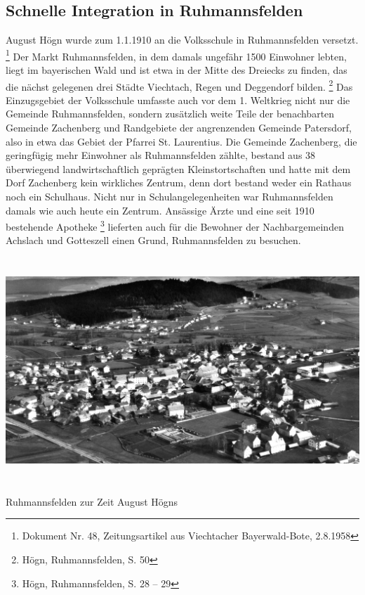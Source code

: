 \subsection{Schnelle Integration in Ruhmannsfelden}

August Högn wurde zum 1.1.1910 an
die Volksschule in Ruhmannsfelden versetzt. \footnote{Dokument Nr. 48,
Zeitungsartikel aus Viechtacher Bayerwald-Bote, 2.8.1958} Der Markt
Ruhmannsfelden, in dem damals ungefähr 1500 Einwohner lebten, liegt im
bayerischen Wald und ist etwa in der Mitte des Dreiecks zu finden, das
die nächst gelegenen drei Städte Viechtach, Regen und Deggendorf
bilden. \footnote{Högn, Ruhmannsfelden, S. 50} Das Einzugsgebiet der
Volksschule umfasste auch vor dem 1. Weltkrieg nicht nur die Gemeinde
Ruhmannsfelden, sondern zusätzlich weite Teile der benachbarten
Gemeinde Zachenberg und Randgebiete der angrenzenden Gemeinde
Patersdorf, also in etwa das Gebiet der Pfarrei St. Laurentius. Die
Gemeinde Zachenberg, die geringfügig mehr Einwohner als Ruhmannsfelden
zählte, bestand aus 38 überwiegend landwirtschaftlich geprägten
Kleinstortschaften und hatte mit dem Dorf Zachenberg kein wirkliches
Zentrum, denn dort bestand weder ein Rathaus noch ein Schulhaus. Nicht
nur in Schulangelegenheiten war Ruhmannsfelden damals wie auch heute
ein Zentrum. Ansässige Ärzte und eine seit 1910 bestehende
Apotheke \footnote{Högn, Ruhmannsfelden, S. 28 – 29} lieferten auch für
die Bewohner der Nachbargemeinden Achslach und Gotteszell einen Grund,
Ruhmannsfelden zu besuchen.


\includegraphics[width=15.981cm,height=8.446cm]{pictures/zulassungsarbeit-img016.jpg}


Ruhmannsfelden zur Zeit August Högns

